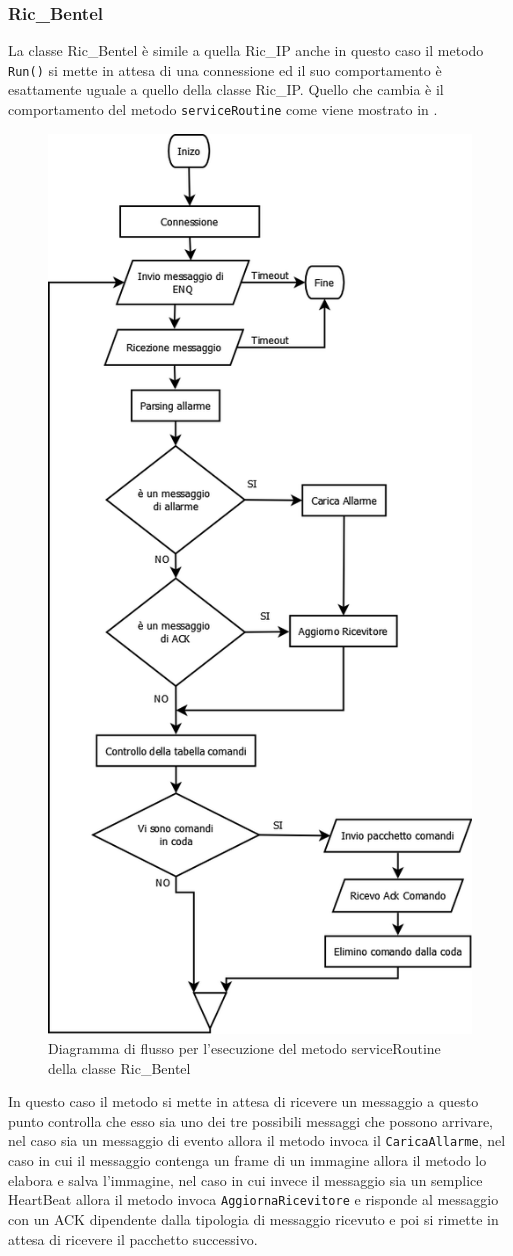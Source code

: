 \subsubsection{Ric\_Bentel}
La classe Ric\_Bentel è simile a quella Ric\_IP anche in questo caso il metodo \texttt{Run()} si mette in attesa di una connessione ed il suo comportamento è esattamente uguale a quello della classe Ric\_IP. Quello che cambia è il comportamento del metodo \texttt{serviceRoutine} come viene mostrato in .
\begin{figure}
	\centering
	\includegraphics[width=0.7\linewidth]{pictures/runurmet.png}
	\caption{Diagramma di flusso per l'esecuzione del metodo serviceRoutine della classe Ric\_Bentel}\label{fig:servicebentel}
\end{figure}
In questo caso il metodo si mette in attesa di ricevere un messaggio a questo punto controlla che esso sia uno dei tre possibili messaggi che possono arrivare, nel caso sia un messaggio di evento allora il metodo invoca il \texttt{CaricaAllarme}, nel caso in cui il messaggio contenga un frame di un immagine allora il metodo lo elabora e salva l'immagine, nel caso in cui invece il messaggio sia un semplice HeartBeat allora il metodo invoca \texttt{AggiornaRicevitore} e risponde al messaggio con un ACK dipendente dalla tipologia di messaggio ricevuto e poi si rimette in attesa di ricevere il pacchetto successivo.